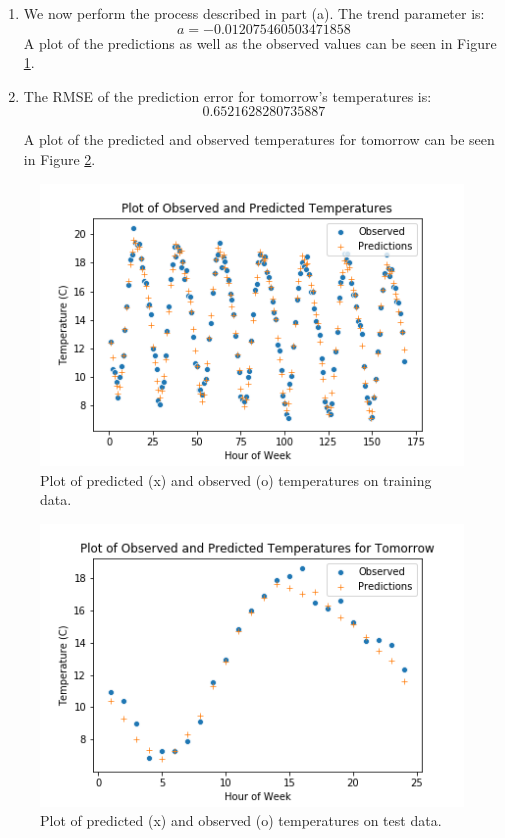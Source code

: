 \documentclass[12pt]{exam}
\begin{document}
\begin{questions}
\begin{solution}
\begin{enumerate}[label=(\alph*)]
      \item We now perform the process described in part (a). The trend parameter is:
      \[
        a=-0.012075460503471858
      \]
      A plot of the predictions as well as the observed values can be seen in Figure \ref{fig:temperatures_on_train}.

      \item 
        The RMSE of the prediction error for tomorrow's temperatures is: 
        \[
          0.6521628280735887
        \]

        A plot of the predicted and observed temperatures for tomorrow can be seen in Figure \ref{fig:temperatures_on_test}.
    \end{enumerate}
  \end{solution}

  \begin{figure}[!ht]
    \centering
    \includegraphics{figures/temps_on_train.png}
    \caption{Plot of predicted (x) and observed (o) temperatures on training data.}
    \label{fig:temperatures_on_train}
  \end{figure}
  \begin{figure}[!ht]
    \centering
    \includegraphics{figures/temps_on_test.png}
    \caption{Plot of predicted (x) and observed (o) temperatures on test data.}
    \label{fig:temperatures_on_test}
  \end{figure}


\end{questions}
\end{document}
